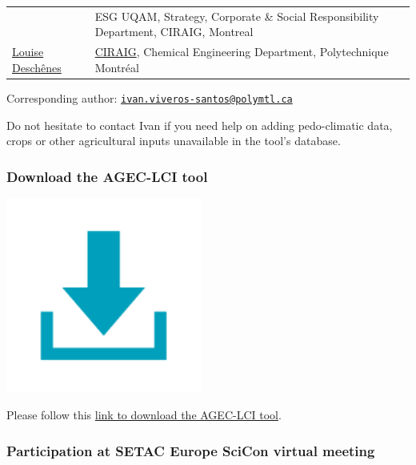 \documentclass[openany]{book}
\begin{document}
\begin{longtable}[]{@{}ll@{}}
\begin{minipage}[t]{0.43\columnwidth}
\end{minipage} & \begin{minipage}[t]{0.51\columnwidth}\raggedright
ESG UQAM, Strategy, Corporate \& Social Responsibility Department, CIRAIG, Montreal\strut
\end{minipage}\tabularnewline
\begin{minipage}[t]{0.43\columnwidth}\raggedright
\href{https://www.polymtl.ca/expertises/deschenes-louise}{Louise Deschênes}\strut
\end{minipage} & \begin{minipage}[t]{0.51\columnwidth}\raggedright
\href{http://www.ciraig.org/fr/}{CIRAIG}, Chemical Engineering Department, Polytechnique Montréal\strut
\end{minipage}\tabularnewline
\bottomrule
\end{longtable}

Corresponding author: \href{mailto:ivan.viveros-santos@polymtl.ca}{\nolinkurl{ivan.viveros-santos@polymtl.ca}}

Do not hesitate to contact Ivan if you need help on adding pedo-climatic data, crops or other agricultural inputs unavailable in the tool's database.

\hypertarget{download-the-agec-lci-tool}{%
\subsubsection*{Download the AGEC-LCI tool}\label{download-the-agec-lci-tool}}

\includegraphics[width=2.53in]{Figures/download_icon}

Please follow this \href{https://drive.google.com/uc?id=1W6N6YtFOAcYjaoyWdH7yVH0TG9iWFRZL\&export=download}{link to download the AGEC-LCI tool}.

\hypertarget{participation-at-setac-europe-scicon-virtual-meeting}{%
\subsubsection*{Participation at SETAC Europe SciCon virtual meeting}\label{participation-at-setac-europe-scicon-virtual-meeting}}
\end{document}

